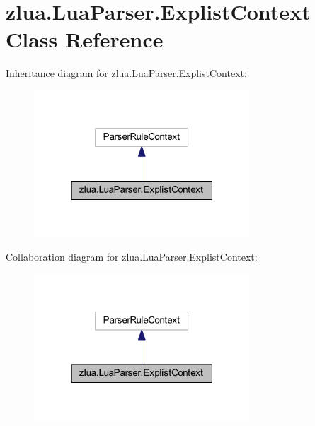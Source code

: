 \hypertarget{classzlua_1_1_lua_parser_1_1_explist_context}{}\section{zlua.\+Lua\+Parser.\+Explist\+Context Class Reference}
\label{classzlua_1_1_lua_parser_1_1_explist_context}


Inheritance diagram for zlua.\+Lua\+Parser.\+Explist\+Context\+:
\nopagebreak
\begin{figure}[H]
\begin{center}
\leavevmode
\includegraphics[width=229pt]{classzlua_1_1_lua_parser_1_1_explist_context__inherit__graph}
\end{center}
\end{figure}


Collaboration diagram for zlua.\+Lua\+Parser.\+Explist\+Context\+:
\nopagebreak
\begin{figure}[H]
\begin{center}
\leavevmode
\includegraphics[width=229pt]{classzlua_1_1_lua_parser_1_1_explist_context__coll__graph}
\end{center}
\end{figure}

